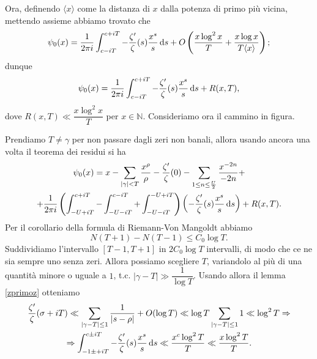 Ora, definendo $\langle x\rangle$ come la distanza di $x$ dalla potenza di primo più vicina, mettendo assieme abbiamo trovato che
$$\psi_0(x)=\frac{1}{2\pi i}\int_{c-iT}^{c+iT} -\frac{\zeta'}{\zeta}(s)\frac{x^s}{s}\mathop{}\!\mathrm{d} s+O\left(\frac{x\log^2{x}}{T}+\frac{x\log{x}}{T\langle x\rangle}\right);$$
dunque
$$\psi_0(x)=\frac{1}{2\pi i}\int_{c-iT}^{c+iT} -\frac{\zeta'}{\zeta}(s)\frac{x^s}{s}\mathop{}\!\mathrm{d} s+R(x,T),$$
dove $R(x,T) \ll \dfrac{x\log^2{x}}{T}$ per $x \in \mathbb{N}$. Consideriamo ora il cammino in figura.
\begin{center}
\end{center}
Prendiamo $T\not=\gamma$ per non passare dagli zeri non banali, allora usando ancora una volta il teorema dei residui si ha
\begin{gather*}
  \psi_0(x)=x-\sum_{|\gamma|<T} \frac{x^{\rho}}{\rho}-\frac{\zeta'}{\zeta}(0)-\sum_{1 \le n \le \frac{U}{2}} \frac{x^{-2n}}{-2n}+\\
  +\frac{1}{2\pi i}\left(\int_{-U+iT}^{c+iT}-\int_{-U-iT}^{c-iT}+\int_{-U-iT}^{-U+iT}\right)\left(-\frac{\zeta'}{\zeta}(s)\frac{x^s}{s}\mathop{}\!\mathrm{d} s\right)+R(x,T).
\end{gather*}
Per il corollario della formula di Riemann-Von Mangoldt abbiamo
$$N(T+1)-N(T-1) \le C_0\log{T}.$$
Suddividiamo l'intervallo $[T-1,T+1]$ in $2C_0\log{T}$ intervalli, di modo che ce ne sia sempre uno senza zeri. Allora possiamo scegliere $T$, variandolo al più di una quantità minore o uguale a $1$, t.c. $|\gamma-T| \gg \dfrac{1}{\log{T}}$. Usando allora il lemma \ref{zprimoz} otteniamo
\begin{gather*}
  \frac{\zeta'}{\zeta}(\sigma+iT) \ll \sum_{|\gamma-T| \le 1} \frac{1}{|s-\rho|}+O(\log{T}) \ll \log{T}\sum_{|\gamma-T| \le 1} 1 \ll \log^2{T} \Rightarrow \\
  \Rightarrow \int_{-1 \pm +iT}^{c \pm iT} -\frac{\zeta'}{\zeta}(s)\frac{x^s}{s}\mathop{}\!\mathrm{d} s \ll \frac{x^c\log^2{T}}{T} \ll \frac{x\log^2{T}}{T}.
\end{gather*}


